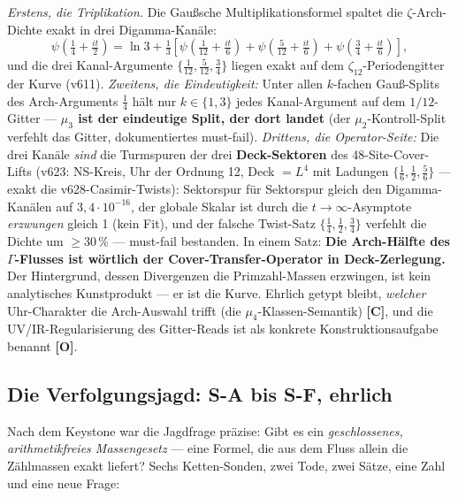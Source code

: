 \documentclass[11pt,a4paper]{article}
\newcommand{\C}{\textcolor{kern}{\textbf{[C]}}}
\newcommand{\OO}{\textcolor{offen}{\textbf{[O]}}}
\begin{document}
\emph{Erstens, die Triplikation.} Die Gaußsche
Multiplikationsformel spaltet die $\zeta$-Arch-Dichte exakt in
drei Digamma-Kanäle:
\[
\psi\!\left(\tfrac14 + \tfrac{it}{2}\right) = \ln 3 + \tfrac13
\left[\psi\!\left(\tfrac{1}{12} + \tfrac{it}{6}\right) +
\psi\!\left(\tfrac{5}{12} + \tfrac{it}{6}\right) +
\psi\!\left(\tfrac{3}{4} + \tfrac{it}{6}\right)\right],
\]
und die drei Kanal-Argumente $\{\tfrac{1}{12}, \tfrac{5}{12},
\tfrac{3}{4}\}$ liegen exakt auf dem $\zeta_{12}$-Periodengitter der
Kurve (v611). \emph{Zweitens, die Eindeutigkeit:} Unter allen
$k$-fachen Gauß-Splits des Arch-Arguments $\tfrac14$ hält nur
$k \in \{1, 3\}$ jedes Kanal-Argument auf dem $1/12$-Gitter ---
\textbf{$\mu_3$ ist der eindeutige Split, der dort landet} (der
$\mu_2$-Kontroll-Split verfehlt das Gitter, dokumentiertes
must-fail). \emph{Drittens, die Operator-Seite:} Die drei Kanäle
\emph{sind} die Turmspuren der drei \textbf{Deck-Sektoren} des
48-Site-Cover-Lifts (v623: NS-Kreis, Uhr der Ordnung 12, Deck $=
L^4$ mit Ladungen $\{\tfrac16, \tfrac12, \tfrac56\}$ --- exakt die
v628-Casimir-Twists): Sektorspur für Sektorspur gleich den
Digamma-Kanälen auf $3{,}4 \cdot 10^{-16}$, der globale Skalar ist
durch die $t \to \infty$-Asymptote \emph{erzwungen} gleich 1 (kein
Fit), und der falsche Twist-Satz $\{\tfrac14, \tfrac12, \tfrac34\}$
verfehlt die Dichte um $\ge 30\,\%$ --- must-fail bestanden.
In einem Satz: \textbf{Die Arch-Hälfte des $\Gamma$-Flusses ist
wörtlich der Cover-Transfer-Operator in Deck-Zerlegung.} Der
Hintergrund, dessen Divergenzen die Primzahl-Massen erzwingen, ist
kein analytisches Kunstprodukt --- er ist die Kurve. Ehrlich
getypt bleibt, \emph{welcher} Uhr-Charakter die Arch-Auswahl
trifft (die $\mu_4$-Klassen-Semantik) \C{}, und die
UV/IR-Regularisierung des Gitter-Reads ist als konkrete
Konstruktionsaufgabe benannt \OO{}.

\subsection*{Die Verfolgungsjagd: S-A bis S-F, ehrlich}

Nach dem Keystone war die Jagdfrage präzise: Gibt es ein
\emph{geschlossenes, arithmetikfreies Massengesetz} --- eine Formel,
die aus dem Fluss allein die Zählmassen exakt liefert? Sechs
Ketten-Sonden, zwei Tode, zwei Sätze, eine Zahl und eine neue Frage:
\end{document}
